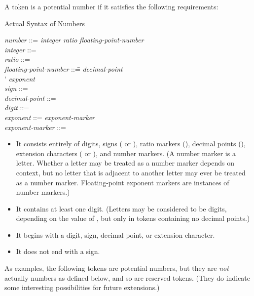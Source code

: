 \goodbreak

A token is a potential number if it satisfies the following
requirements:


\begin{table}[t]
\caption{Actual Syntax of Numbers}
\label{NUMBER-SYNTAX-TABLE}
\tabbingsep=0pt
\normalsize
\begin{tabbing}
\emph{number} ::= \emph{integer} {\Mor} \emph{ratio} {\Mor} \emph{floating-point-number} \\
\emph{integer} ::=    \\
\emph{ratio} ::=   \cdf{/}  \\
\emph{floating-point-number} ::=\=   \emph{decimal-point}   \\
\>{\Mor} \'   \emph{exponent} \\ \emph{sign} ::= \cdf{+} {\Mor} \cdf{-} \\
\emph{decimal-point} ::=  \\
\emph{digit} ::=  {\Mor}  {\Mor}  {\Mor}  {\Mor} 
         {\Mor}  {\Mor}  {\Mor}  {\Mor}  {\Mor}  \\
\emph{exponent} ::= \emph{exponent-marker}   \\
\emph{exponent-marker} ::=  {\Mor}  {\Mor}  {\Mor}  {\Mor} 
                   {\Mor}  {\Mor}  {\Mor}  {\Mor}  {\Mor} 
\end{tabbing}
\end{table}


\begin{itemize}
\item
It consists entirely of digits, signs (\cdf{+} or \cdf{-}),
ratio markers (\cdf{/}), decimal points (), extension characters
(\cd{{\Xcircumflex}} or \cd{{\Xunderscore}}), and number markers.  (A number marker is
a letter.  Whether a letter may be treated as a number marker depends
on context, but no letter that is adjacent to another letter may ever be
treated as a number marker.  Floating-point exponent markers are instances
of number markers.)

\item
It contains at least one digit.  (Letters may be considered to be
digits, depending on the value of , but only
in tokens containing no decimal points.)

\item
It begins with a digit, sign, decimal point, or extension character.

\item
It does not end with a sign.
\end{itemize}
As examples, the following tokens are potential numbers,
but they are \emph{not} actually numbers as defined below, and so are
reserved tokens.  (They do indicate some interesting possibilities
for future extensions.)

